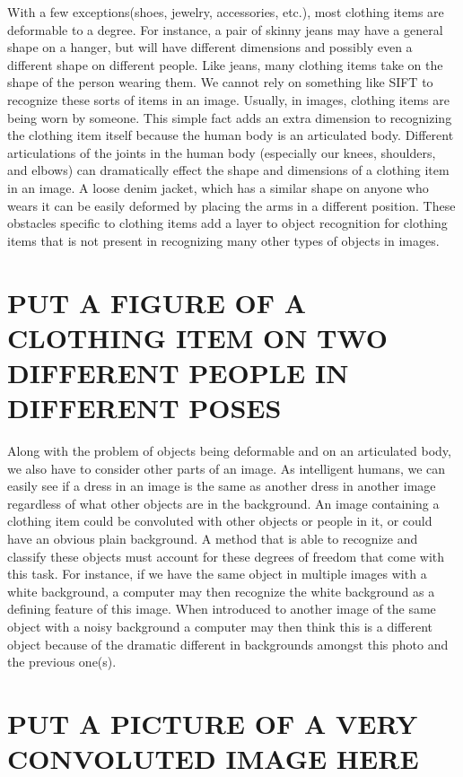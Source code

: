 \documentclass[12pt]{article} %
\begin{document}
	With a few exceptions(shoes, jewelry, accessories, etc.), most clothing items are deformable to a degree. For instance, a pair of skinny jeans may have a general shape on a hanger, but will have different dimensions and possibly even a different shape on different people. Like jeans, many clothing items take on the shape of the person wearing them. We cannot rely on something like SIFT\cite{lowe1999object} to recognize these sorts of items in an image. Usually, in images, clothing items are being worn by someone. This simple fact adds an extra dimension to recognizing the clothing item itself because the human body is an articulated body. Different articulations of the joints in the human body (especially our knees, shoulders, and elbows) can dramatically effect the shape and dimensions of a clothing item in an image. A loose denim jacket, which has a similar shape on anyone who wears it can be easily deformed by placing the arms in a different position. These obstacles specific to clothing items add a layer to object recognition for clothing items that is not present in recognizing many other types of objects in images.

 \section{PUT A FIGURE OF A CLOTHING ITEM ON TWO DIFFERENT PEOPLE IN DIFFERENT POSES}


	Along with the problem of objects being deformable and on an articulated body, we also have to consider other parts of an image. As intelligent humans, we can easily see if a dress in an image is the same as another dress in another image regardless of what other objects are in the background.  An image containing a clothing item could be convoluted with other objects or people in it, or could have an obvious plain background. A method that is able to recognize and classify these objects must account for these degrees of freedom that come with this task. For instance, if we have the same object in multiple images with a white background, a computer may then recognize the white background as a defining feature of this image. When introduced to another image of the same object with a noisy background a computer may then think this is a different object because of the dramatic different in backgrounds amongst this photo and the previous one(s). 
	
 \section{PUT A PICTURE OF A  VERY CONVOLUTED IMAGE HERE }
\end{document}
